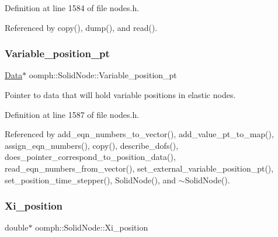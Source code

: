 Definition at line 1584 of file nodes.\+h.



Referenced by copy(), dump(), and read().

\mbox{\label{classoomph_1_1SolidNode_a5f3dce8a2802efc650d67cbf7e407a98}} 
\subsubsection{\texorpdfstring{Variable\+\_\+position\+\_\+pt}{Variable\_position\_pt}}
{\footnotesize\ttfamily \hyperlink{classoomph_1_1Data}{Data}$\ast$ oomph\+::\+Solid\+Node\+::\+Variable\+\_\+position\+\_\+pt\hspace{0.3cm}{\ttfamily [protected]}}



Pointer to data that will hold variable positions in elastic nodes. 



Definition at line 1587 of file nodes.\+h.



Referenced by add\+\_\+eqn\+\_\+numbers\+\_\+to\+\_\+vector(), add\+\_\+value\+\_\+pt\+\_\+to\+\_\+map(), assign\+\_\+eqn\+\_\+numbers(), copy(), describe\+\_\+dofs(), does\+\_\+pointer\+\_\+correspond\+\_\+to\+\_\+position\+\_\+data(), read\+\_\+eqn\+\_\+numbers\+\_\+from\+\_\+vector(), set\+\_\+external\+\_\+variable\+\_\+position\+\_\+pt(), set\+\_\+position\+\_\+time\+\_\+stepper(), Solid\+Node(), and $\sim$\+Solid\+Node().

\mbox{\label{classoomph_1_1SolidNode_ac8ed3701effa80f70d817ee171559d1f}} 
\subsubsection{\texorpdfstring{Xi\+\_\+position}{Xi\_position}}
{\footnotesize\ttfamily double$\ast$ oomph\+::\+Solid\+Node\+::\+Xi\+\_\+position\hspace{0.3cm}{\ttfamily [protected]}}




